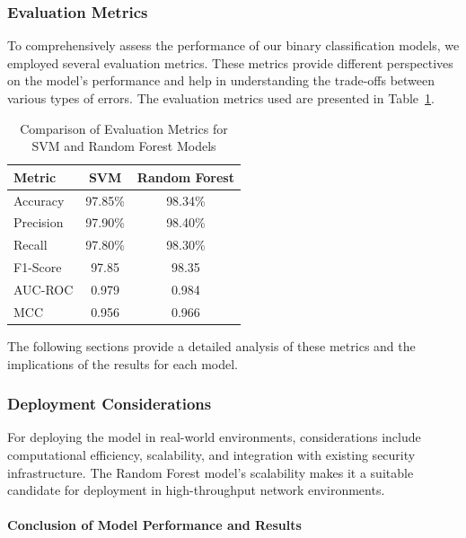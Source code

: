 \subsubsection{Evaluation Metrics}

To comprehensively assess the performance of our binary classification models, we employed several evaluation metrics. These metrics provide different perspectives on the model’s performance and help in understanding the trade-offs between various types of errors. The evaluation metrics used are presented in Table~\ref{tab:evaluation_metrics}.

\begin{table}[h]
    \centering
    \caption{Comparison of Evaluation Metrics for SVM and Random Forest Models}
    \label{tab:evaluation_metrics}
    \begin{tabular}{|l|c|c|}
        \hline
        \textbf{Metric} & \textbf{SVM} & \textbf{Random Forest} \\
        \hline
        Accuracy & 97.85\% & 98.34\% \\
        \hline
        Precision & 97.90\% & 98.40\% \\
        \hline
        Recall & 97.80\% & 98.30\% \\
        \hline
        F1-Score & 97.85 & 98.35 \\
        \hline
        AUC-ROC & 0.979 & 0.984 \\
        \hline
        MCC & 0.956 & 0.966 \\
        \hline
    \end{tabular}
\end{table}

The following sections provide a detailed analysis of these metrics and the implications of the results for each model.

\subsubsection{Deployment Considerations}
For deploying the model in real-world environments, considerations include computational efficiency, scalability, and integration with existing security infrastructure. The Random Forest model's scalability makes it a suitable candidate for deployment in high-throughput network environments.

\paragraph{Conclusion of Model Performance and Results}


